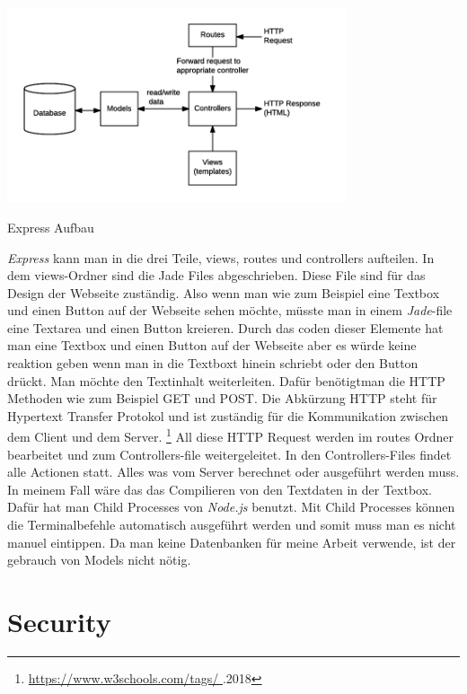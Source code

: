 \documentclass[10pt]{article}
\begin{document}
\begin{floatingfigure}[r]{11cm}
    \centering
    \includegraphics[width=10cm]{Bilder/MVCexpress.png}
    \caption{Express Aufbau}
    \label{fig:figlabel}
\end{floatingfigure}

\textit{Express} kann man in die drei Teile, views, routes und controllers aufteilen. In dem views-Ordner sind die Jade Files abgeschrieben. Diese File sind für das Design der Webseite zuständig. Also wenn man wie zum Beispiel eine Textbox und einen Button auf der Webseite sehen möchte, müsste man in einem \textit{Jade}-file eine Textarea und einen Button kreieren. Durch das coden dieser Elemente hat man eine Textbox und einen Button auf der Webseite aber es würde keine reaktion geben wenn man in die Textboxt hinein schriebt oder den Button drückt. Man möchte den Textinhalt weiterleiten. Dafür benötigtman die HTTP Methoden wie zum Beispiel GET und POST. Die Abkürzung HTTP steht für Hypertext Transfer Protokol und ist zuständig für die Kommunikation zwischen dem Client und dem Server.  \footnote{\label{foot:4} \href{https://www.w3schools.com/tags/ref_httpmethods.asp}{https://www.w3schools.com/tags/ %
} .2018} All diese HTTP Request werden im routes Ordner bearbeitet und zum Controllers-file weitergeleitet. In den Controllers-Files findet alle Actionen statt. Alles was vom Server berechnet oder ausgeführt werden muss. In meinem Fall wäre das das Compilieren von den Textdaten in der Textbox. Dafür hat man Child Processes  von \textit{Node.js} benutzt. Mit Child Processes können die Terminalbefehle automatisch ausgeführt werden und somit muss man es nicht manuel eintippen. Da man keine Datenbanken für meine Arbeit verwende, ist der gebrauch von Models nicht nötig. 

	
	\pagebreak
	\section{Security}
\end{document}

